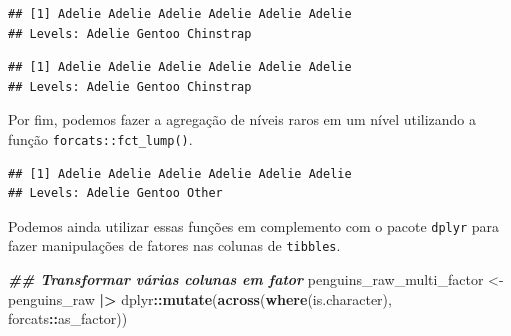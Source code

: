 \documentclass[
]{article}
\newenvironment{Shaded}{\begin{snugshade}}{\end{snugshade}}
\newcommand{\DocumentationTok}[1]{\textcolor[rgb]{0.56,0.35,0.01}{\textbf{\textit{#1}}}}
\newcommand{\FunctionTok}[1]{\textcolor[rgb]{0.13,0.29,0.53}{\textbf{#1}}}
\newcommand{\NormalTok}[1]{#1}
\newcommand{\OtherTok}[1]{\textcolor[rgb]{0.56,0.35,0.01}{#1}}
\newcommand{\SpecialCharTok}[1]{\textcolor[rgb]{0.81,0.36,0.00}{\textbf{#1}}}
\begin{document}
\begin{verbatim}
## [1] Adelie Adelie Adelie Adelie Adelie Adelie
## Levels: Adelie Gentoo Chinstrap
\end{verbatim}

\begin{Shaded}
\end{Shaded}

\begin{verbatim}
## [1] Adelie Adelie Adelie Adelie Adelie Adelie
## Levels: Adelie Gentoo Chinstrap
\end{verbatim}

Por fim, podemos fazer a agregação de níveis raros em um nível utilizando a função \texttt{forcats::fct\_lump()}.

\begin{Shaded}
\end{Shaded}

\begin{verbatim}
## [1] Adelie Adelie Adelie Adelie Adelie Adelie
## Levels: Adelie Gentoo Other
\end{verbatim}

Podemos ainda utilizar essas funções em complemento com o pacote \texttt{dplyr} para fazer manipulações de fatores nas colunas de \texttt{tibbles}.

\begin{Shaded}
\begin{Highlighting}[]
\DocumentationTok{\#\# Transformar várias colunas em fator}
\NormalTok{penguins\_raw\_multi\_factor }\OtherTok{\textless{}{-}}\NormalTok{ penguins\_raw }\SpecialCharTok{|\textgreater{}} 
\NormalTok{    dplyr}\SpecialCharTok{::}\FunctionTok{mutate}\NormalTok{(}\FunctionTok{across}\NormalTok{(}\FunctionTok{where}\NormalTok{(is.character), forcats}\SpecialCharTok{::}\NormalTok{as\_factor))}
\end{Highlighting}
\end{Shaded}
\end{document}
